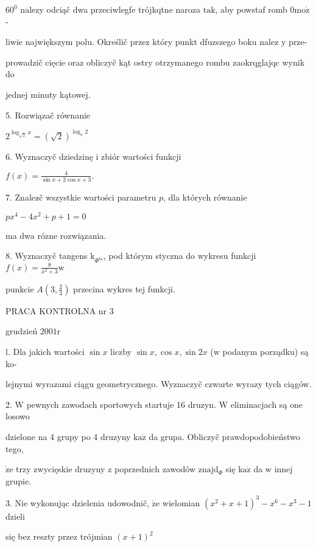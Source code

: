 \documentclass[a4paper,12pt]{article}
\begin{document}
$60^{0}$ nalezy odciąč dwa przeciwlegfe trójkqtne naroza $\mathrm{t}\mathrm{a}\mathrm{k}$, aby powstaf romb $0\mathrm{m}\mathrm{o}\dot{\mathrm{z}}$-

liwie największym polu. Określič przez który punkt dfuzszego boku nalez $\mathrm{y}$ prze-

prowadzič cięcie oraz obliczyč kąt ostry otrzymanego rombu zaokrqglajqc wynik do

jednej minuty kątowej.

5. Rozwiązač równanie

$2^{\log_{\sqrt{2}}x}=(\sqrt{2})^{\log_{x}2}$

6. Wyznaczyč dziedzinę i zbiór wartości funkcji

$f(x)=\displaystyle \frac{4}{\sin x+2\cos x+3}.$

7. Znalez$\acute{}$č wszystkie wartości parametru $p$, dla których równanie

$px^{4}-4x^{2}+p+1=0$

ma dwa rózne rozwiązania.

8. Wyznaczyč tangens $\mathrm{k}_{\Phi^{\mathrm{t}\mathrm{a}}}$, pod którym styczna do wykresu funkcji $f(x) = \displaystyle \frac{8}{x^{2}+3} \mathrm{w}$

punkcie $A(3,\displaystyle \frac{2}{3})$ przecina wykres tej funkcji.





PRACA KONTROLNA nr 3

grudzień $2001\mathrm{r}$

l. Dla jakich wartości $\sin x$ liczby $\sin x, \cos x, \sin 2x$ ($\mathrm{w}$ podanym porządku) są ko-

lejnymi wyrazami ciągu geometrycznego. Wyznaczyč czwarte wyrazy tych ciągów.

2. $\mathrm{W}$ pewnych zawodach sportowych startuje 16 druzyn. $\mathrm{W}$ eliminacjach są one losowo

dzielone na 4 grupy po 4 druzyny $\mathrm{k}\mathrm{a}\dot{\mathrm{z}}$ da grupa. Obliczyč prawdopodobieństwo tego,

$\dot{\mathrm{z}}\mathrm{e}$ trzy zwycięskie druzyny $\mathrm{z}$ poprzednich zawodów $\mathrm{z}\mathrm{n}\mathrm{a}\mathrm{j}\mathrm{d}_{\Phi}$ się $\mathrm{k}\mathrm{a}\dot{\mathrm{z}}$ da $\mathrm{w}$ innej grupie.

3. Nie wykonując dzielenia udowodnič, $\dot{\mathrm{z}}\mathrm{e}$ wielomian $(x^{2}+x+1)^{3}-x^{6}-x^{3}-1$ dzieli

się bez reszty przez trójmian $(x+1)^{2}$
\end{document}
